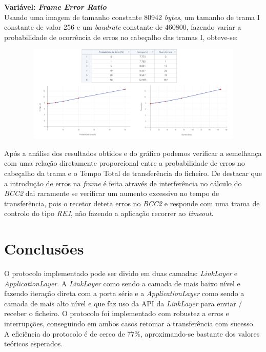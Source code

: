 \documentclass[a4paper, 11pt]{article}
\begin{document}
\textbf{Variável: \textit{Frame Error Ratio}}\\
Usando uma imagem de tamanho constante 80942 \textit{bytes}, um tamanho de trama I constante de valor 256 e um \textit{baudrate} constante de 460800, fazendo variar a probabilidade de ocorrência de erros no cabeçalho das tramas I, obteve-se:
\begin{figure}[h!]
\begin{center}
\includegraphics[width=13cm, height= 4.6cm]{images/FER.png}
\end{center}
\end{figure}

Após a análise dos resultados obtidos e do gráfico podemos verificar a semelhança com uma relação diretamente proporcional entre a probabilidade de erros no cabeçalho da trama e o Tempo Total de transferência do ficheiro. De destacar que a introdução de erros na \textit{frame} é feita através de interferência no cálculo do \textit{BCC2} dai raramente se verificar um aumento excessivo no tempo de transferência, pois o recetor deteta erros no \textit{BCC2} e responde com uma trama de controlo do tipo \textit{REJ}, não fazendo a aplicação recorrer ao \textit{timeout}.


\section{Conclusões}

O protocolo implementado pode ser divido em duas camadas: \textit{LinkLayer} e \textit{ApplicationLayer}. A \textit{LinkLayer} como sendo a camada de mais baixo nível e fazendo iteração direta com a porta série e a \textit{ApplicationLayer} como sendo a camada de mais alto nível e que faz uso da API da \textit{LinkLayer} para enviar / receber o ficheiro. O protocolo foi implementado com robustez a erros e interrupções, conseguindo em ambos casos retomar a transferência com sucesso. A eficiência do protocolo é de cerco de 77\%, aproximando-se bastante dos valores teóricos esperados.
\end{document}
